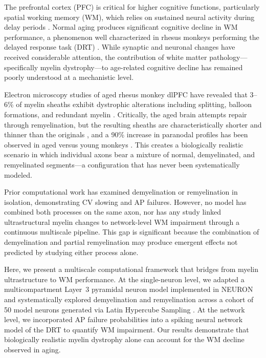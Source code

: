 \documentclass[11pt]{article}
\begin{document}
The prefrontal cortex (PFC) is critical for higher cognitive functions, particularly spatial working memory (WM), which relies on sustained neural activity during delay periods \citep{goldman1995cellular, compte2000synaptic}. Normal aging produces significant cognitive decline in WM performance, a phenomenon well characterized in rhesus monkeys performing the delayed response task (DRT) \citep{chang2005age}. While synaptic and neuronal changes have received considerable attention, the contribution of white matter pathology---specifically myelin dystrophy---to age-related cognitive decline has remained poorly understood at a mechanistic level.

Electron microscopy studies of aged rhesus monkey dlPFC have revealed that 3--6\% of myelin sheaths exhibit dystrophic alterations including splitting, balloon formations, and redundant myelin \citep{peters2002effects, bowley2010age}. Critically, the aged brain attempts repair through remyelination, but the resulting sheaths are characteristically shorter and thinner than the originals \citep{lasiene2008remyelination, powers2013remyelination, young2013myelin}, and a 90\% increase in paranodal profiles has been observed in aged versus young monkeys \citep{peters2002effects}. This creates a biologically realistic scenario in which individual axons bear a mixture of normal, demyelinated, and remyelinated segments---a configuration that has never been systematically modeled.

Prior computational work has examined demyelination \citep{stephanova2005myelin, stephanova2008conduction} or remyelination \citep{scurfield2018thin} in isolation, demonstrating CV slowing and AP failures. However, no model has combined both processes on the same axon, nor has any study linked ultrastructural myelin changes to network-level WM impairment through a continuous multiscale pipeline. This gap is significant because the combination of demyelination and partial remyelination may produce emergent effects not predicted by studying either process alone.

Here, we present a multiscale computational framework that bridges from myelin ultrastructure to WM performance. At the single-neuron level, we adapted a multicompartment Layer~3 pyramidal neuron model \citep{rumbell2016dimensionality} implemented in NEURON \citep{hines1997neuron} and systematically explored demyelination and remyelination across a cohort of 50 model neurons generated via Latin Hypercube Sampling \citep{mckay1979comparison}. At the network level, we incorporated AP failure probabilities into a spiking neural network model of the DRT \citep{compte2000synaptic, wang2001probabilistic} to quantify WM impairment. Our results demonstrate that biologically realistic myelin dystrophy alone can account for the WM decline observed in aging.
\end{document}
